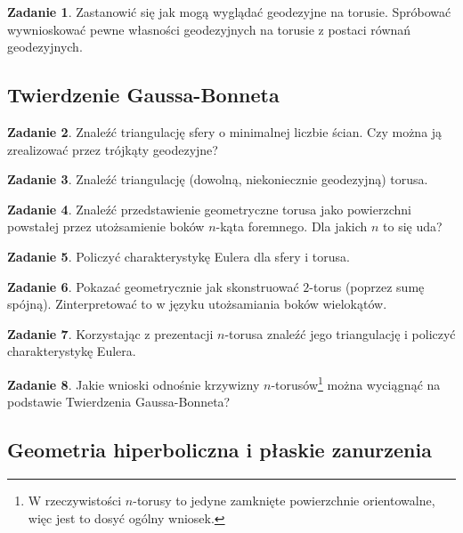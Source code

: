 \documentclass[a4paper,11pt]{article}
\theoremstyle{definition}\newtheorem{exercise}{Zadanie}
\theoremstyle{definition}\newtheorem{remark}{Uwaga}
\begin{document}
\begin{exercise}
 Zastanowić się jak mogą wyglądać geodezyjne na torusie. Spr\'obować 
wywnioskować pewne własności geodezyjnych na torusie z postaci r\'ownań 
geodezyjnych.
\end{exercise}


\subsection{Twierdzenie Gaussa-Bonneta}

\begin{exercise}
Znaleźć triangulację sfery o minimalnej liczbie ścian. Czy można ją zrealizować 
przez tr\'ojkąty geodezyjne?
\end{exercise}

\begin{exercise}
Znaleźć triangulację (dowolną, niekoniecznie geodezyjną) torusa.
\end{exercise}

\begin{exercise}
Znaleźć przedstawienie geometryczne torusa jako powierzchni 
powstałej przez utożsamienie bok\'ow $n$\nobreakdash-kąta foremnego. Dla jakich 
$n$ to się uda?
\end{exercise}

\begin{exercise}
 Policzyć charakterystykę Eulera dla sfery i torusa.
\end{exercise}

\begin{exercise}
 Pokazać geometrycznie jak skonstruować $2$\nobreakdash-torus (poprzez sumę 
sp\'ojną). Zinterpretować to w języku utożsamiania bok\'ow wielokąt\'ow.
\end{exercise}

\begin{exercise}
Korzystając z prezentacji $n$\nobreakdash-torusa znaleźć jego triangulację i 
policzyć charakterystykę Eulera. 
\end{exercise}

\begin{exercise}
Jakie wnioski odnośnie krzywizny $n$\nobreakdash-torus\'ow\footnote{W 
rzeczywistości $n$\nobreakdash-torusy to jedyne zamknięte powierzchnie 
orientowalne, więc jest to dosyć og\'olny wniosek.} można wyciągnąć na 
podstawie Twierdzenia Gaussa-Bonneta?
\end{exercise}

\subsection{Geometria hiperboliczna i płaskie zanurzenia}
\end{document}
